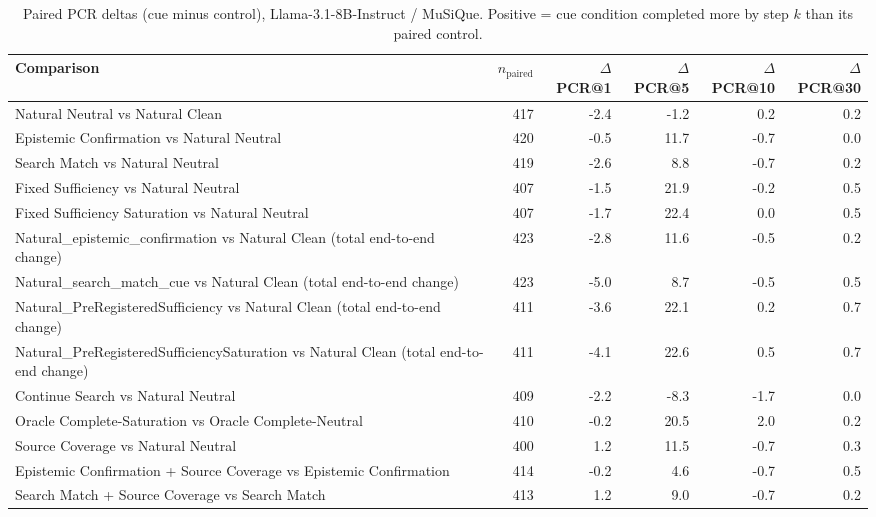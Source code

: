 \begin{table}[t]
\centering
\caption{Paired PCR deltas (cue minus control), Llama-3.1-8B-Instruct / MuSiQue. Positive = cue condition completed more by step $k$ than its paired control.}
\begin{tabular}{lrrrrr}
\toprule
Comparison & $n_{\text{paired}}$ & $\Delta$PCR@1 & $\Delta$PCR@5 & $\Delta$PCR@10 & $\Delta$PCR@30 \\
\midrule
Natural Neutral vs Natural Clean & 417 & -2.4 & -1.2 & 0.2 & 0.2 \\
Epistemic Confirmation vs Natural Neutral & 420 & -0.5 & 11.7 & -0.7 & 0.0 \\
Search Match vs Natural Neutral & 419 & -2.6 & 8.8 & -0.7 & 0.2 \\
Fixed Sufficiency vs Natural Neutral & 407 & -1.5 & 21.9 & -0.2 & 0.5 \\
Fixed Sufficiency Saturation vs Natural Neutral & 407 & -1.7 & 22.4 & 0.0 & 0.5 \\
Natural\_epistemic\_confirmation vs Natural Clean (total end-to-end change) & 423 & -2.8 & 11.6 & -0.5 & 0.2 \\
Natural\_search\_match\_cue vs Natural Clean (total end-to-end change) & 423 & -5.0 & 8.7 & -0.5 & 0.5 \\
Natural\_PreRegisteredSufficiency vs Natural Clean (total end-to-end change) & 411 & -3.6 & 22.1 & 0.2 & 0.7 \\
Natural\_PreRegisteredSufficiencySaturation vs Natural Clean (total end-to-end change) & 411 & -4.1 & 22.6 & 0.5 & 0.7 \\
Continue Search vs Natural Neutral & 409 & -2.2 & -8.3 & -1.7 & 0.0 \\
Oracle Complete-Saturation vs Oracle Complete-Neutral & 410 & -0.2 & 20.5 & 2.0 & 0.2 \\
Source Coverage vs Natural Neutral & 400 & 1.2 & 11.5 & -0.7 & 0.3 \\
Epistemic Confirmation + Source Coverage vs Epistemic Confirmation & 414 & -0.2 & 4.6 & -0.7 & 0.5 \\
Search Match + Source Coverage vs Search Match & 413 & 1.2 & 9.0 & -0.7 & 0.2 \\
\bottomrule
\end{tabular}
\end{table}

